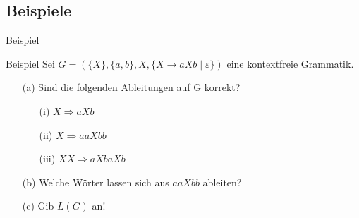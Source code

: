 \subsection{Beispiele}
\begin{frame}{Beispiel}

\begin{exampleblock}{Beispiel}
	 Sei $G = (\{X\}, \{a, b\}, X, \{X \to aXb \mid \varepsilon\})$ eine kontextfreie Grammatik.
	
	\begin{itemize}
		\item[(a)] Sind die folgenden Ableitungen auf G korrekt?
					\begin{itemize}
						\item[(i)] $X \Rightarrow aXb$
						\item[(ii)] $X \Rightarrow aaXbb$
						\item[(iii)] $XX \Rightarrow aXbaXb$
					\end{itemize}
		\item[(b)] Welche Wörter lassen sich aus $aaXbb$ ableiten?
		\item[(c)] Gib $L(G)$ an!
	\end{itemize}
\end{exampleblock}
	
	
\end{frame}

